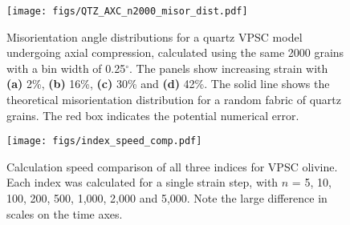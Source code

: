 \documentclass[a4paper,12pt,twoside]{report}
\numberwithin{equation}{chapter}
\begin{document}
\begin{figure}[h!]
  \centering
    \texttt{[image: figs/QTZ\_AXC\_n2000\_misor\_dist.pdf]}
  \caption[Misorientation angle distribution (quartz VPSC, higher resolution)]{Misorientation angle distributions for a quartz VPSC model undergoing axial compression, calculated using the same 2000 grains with a bin width of 0.25$^{\circ}$. The panels show increasing strain with \textbf{(a)} 2\%, \textbf{(b)} 16\%, \textbf{(c)} 30\% and \textbf{(d)} 42\%. The solid line shows the theoretical misorientation distribution for a random fabric of quartz grains. The red box indicates the potential numerical error.} 
  \label{fig:app:quartz_VPSC_anomaly}
\end{figure} 

\begin{figure}[h!]
  \centering
    \texttt{[image: figs/index\_speed\_comp.pdf]}
  \caption[Index speed comparison]{Calculation speed comparison of all three indices for VPSC olivine. Each index was calculated for a single strain step, with $n$ = 5, 10, 100, 200, 500, 1,000, 2,000 and 5,000. Note the large difference in scales on the time axes.} 
  \label{fig:app:index_speed}
\end{figure} 



\clearpage
\end{document}
